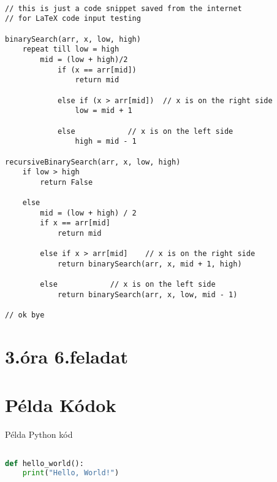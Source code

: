 \documentclass[12]{article}
\begin{document}
\begin{lstlisting}

// this is just a code snippet saved from the internet
// for LaTeX code input testing

binarySearch(arr, x, low, high)
	repeat till low = high
		mid = (low + high)/2
			if (x == arr[mid])
				return mid

			else if (x > arr[mid])	// x is on the right side
				low = mid + 1

			else			// x is on the left side
				high = mid - 1

recursiveBinarySearch(arr, x, low, high)
	if low > high
		return False

	else
		mid = (low + high) / 2
		if x == arr[mid]
			return mid

		else if x > arr[mid]	// x is on the right side
			return binarySearch(arr, x, mid + 1, high)

		else			// x is on the left side
			return binarySearch(arr, x, low, mid - 1)

// ok bye
\end{lstlisting}
\lstset{frame=none} %
\newpage

\section{3.óra 6.feladat}






\section*{Példa Kódok}


\begin{pythoncode}
\caption{Példa Python kód}
\begin{lstlisting}[language=Python]

def hello_world():
    print("Hello, World!")
\end{lstlisting}
\end{pythoncode}
\end{document}
